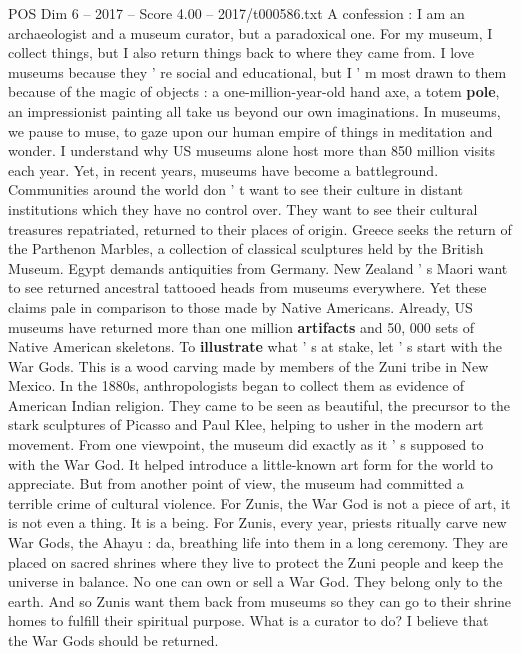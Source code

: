 \begin{textsample}{POS Dim 6 – 2017 – Score 4.00 – 2017/t000586.txt}  \label{ex:f6_pos_060}
A confession : I am an archaeologist and a museum curator, but a paradoxical one.
For my museum, I collect things, but I also return things back to where they came from.
I love museums because they ' re social and educational, but I ' m most drawn to them because of the magic of objects : a one-million-year-old hand axe, a totem \textbf{pole}, an impressionist painting all take us beyond our own imaginations.
In museums, we pause to muse, to gaze upon our human empire of things in meditation and wonder.
I understand why US museums alone host more than 850 million visits each year.
Yet, in recent years, museums have become a battleground.
Communities around the world don ' t want to see their culture in distant institutions which they have no control over.
They want to see their cultural treasures repatriated, returned to their places of origin.
Greece seeks the return of the Parthenon Marbles, a collection of classical sculptures held by the British Museum.
Egypt demands antiquities from Germany.
New Zealand ' s Maori want to see returned ancestral tattooed heads from museums everywhere.
Yet these claims pale in comparison to those made by Native Americans.
Already, US museums have returned more than one million \textbf{artifacts} and 50, 000 sets of Native American skeletons.
To \textbf{illustrate} what ' s at stake, let ' s start with the War Gods.
This is a wood carving made by members of the Zuni tribe in New Mexico.
In the 1880s, anthropologists began to collect them as evidence of American Indian religion.
They came to be seen as beautiful, the precursor to the stark sculptures of Picasso and Paul Klee, helping to usher in the modern art movement.
From one viewpoint, the museum did exactly as it ' s supposed to with the War God.
It helped introduce a little-known art form for the world to appreciate.
But from another point of view, the museum had committed a terrible crime of cultural violence.
For Zunis, the War God is not a piece of art, it is not even a thing.
It is a being.
For Zunis, every year, priests ritually carve new War Gods, the Ahayu : da, breathing life into them in a long ceremony.
They are placed on sacred shrines where they live to protect the Zuni people and keep the universe in balance.
No one can own or sell a War God.
They belong only to the earth.
And so Zunis want them back from museums so they can go to their shrine homes to fulfill their spiritual purpose.
What is a curator to do?
I believe that the War Gods should be returned.

\end{textsample}

